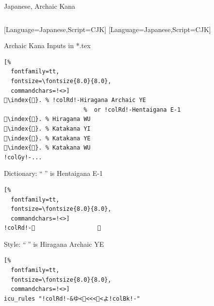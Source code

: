 \documentclass[aspectratio=169,10pt]{beamer}
\begin{document}
\begin{frame}[fragile]{Japanese, Archaic Kana}

\begin{columns}
\begin{column}{55mm}

\setmonofont{mkanaplus-regular.ttf}[Language=Japanese,Script=CJK]
\setsansfont{mkanaplus-regular.ttf}[Language=Japanese,Script=CJK]
\begin{exampleblock}{Archaic Kana Inputs in *.tex}
\begin{Verbatim}[%
  fontfamily=tt,
  fontsize=\fontsize{8.0}{8.0},
  commandchars=!<>]
𛀁\index{𛀁}. % !colRd!-Hiragana Archaic YE
                       %  or !colRd!-Hentaigana E-1
𛄟\index{𛄟}. % Hiragana WU
𛄠\index{𛄠}. % Katakana YI
𛄡\index{𛄡}. % Katakana YE
𛄢\index{𛄢}. % Katakana WU
!colGy!-...
\end{Verbatim}
\end{exampleblock}
\begin{exampleblock}{Dictionary: \footnotesize ``𛀁'' is Hentaigana E-1}
\begin{Verbatim}[%
  fontfamily=tt,
  fontsize=\fontsize{8.0}{8.0},
  commandchars=!<>]
!colRd!-𛀁                  え
\end{Verbatim}
\end{exampleblock}
\begin{exampleblock}{Style: \footnotesize ``𛀁'' is Hiragana Archaic YE}
\begin{Verbatim}[%
  fontfamily=tt,
  fontsize=\fontsize{8.0}{8.0},
  commandchars=!<>]
icu_rules "!colRd!-&ゆ<𛀁<<<𛄡<よ!colBk!-"
\end{Verbatim}
\end{exampleblock}
\end{column}

\begin{column}{38mm}
\begin{center}
\end{center}
\end{column}

\begin{column}{38mm}
\begin{center}
\end{center}
\end{column}
\end{columns}

\end{frame}
\end{document}
